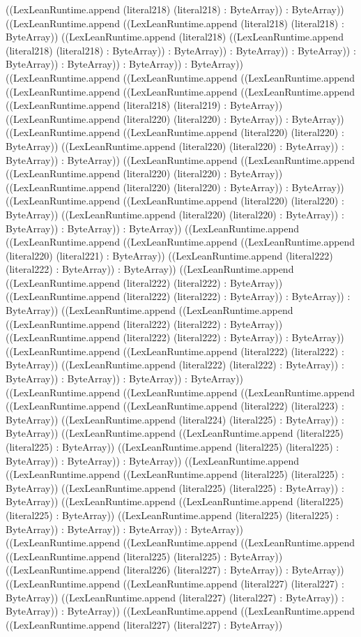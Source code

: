 \documentclass[11pt]{article}
\begin{document}
((LexLeanRuntime.append (literal218) (literal218) : ByteArray)) : ByteArray)) ((LexLeanRuntime.append ((LexLeanRuntime.append (literal218) (literal218) : ByteArray)) ((LexLeanRuntime.append (literal218) ((LexLeanRuntime.append (literal218) (literal218) : ByteArray)) : ByteArray)) : ByteArray)) : ByteArray)) : ByteArray)) : ByteArray)) : ByteArray)) : ByteArray)) ((LexLeanRuntime.append ((LexLeanRuntime.append ((LexLeanRuntime.append ((LexLeanRuntime.append ((LexLeanRuntime.append ((LexLeanRuntime.append ((LexLeanRuntime.append (literal218) (literal219) : ByteArray)) ((LexLeanRuntime.append (literal220) (literal220) : ByteArray)) : ByteArray)) ((LexLeanRuntime.append ((LexLeanRuntime.append (literal220) (literal220) : ByteArray)) ((LexLeanRuntime.append (literal220) (literal220) : ByteArray)) : ByteArray)) : ByteArray)) ((LexLeanRuntime.append ((LexLeanRuntime.append ((LexLeanRuntime.append (literal220) (literal220) : ByteArray)) ((LexLeanRuntime.append (literal220) (literal220) : ByteArray)) : ByteArray)) ((LexLeanRuntime.append ((LexLeanRuntime.append (literal220) (literal220) : ByteArray)) ((LexLeanRuntime.append (literal220) (literal220) : ByteArray)) : ByteArray)) : ByteArray)) : ByteArray)) ((LexLeanRuntime.append ((LexLeanRuntime.append ((LexLeanRuntime.append ((LexLeanRuntime.append (literal220) (literal221) : ByteArray)) ((LexLeanRuntime.append (literal222) (literal222) : ByteArray)) : ByteArray)) ((LexLeanRuntime.append ((LexLeanRuntime.append (literal222) (literal222) : ByteArray)) ((LexLeanRuntime.append (literal222) (literal222) : ByteArray)) : ByteArray)) : ByteArray)) ((LexLeanRuntime.append ((LexLeanRuntime.append ((LexLeanRuntime.append (literal222) (literal222) : ByteArray)) ((LexLeanRuntime.append (literal222) (literal222) : ByteArray)) : ByteArray)) ((LexLeanRuntime.append ((LexLeanRuntime.append (literal222) (literal222) : ByteArray)) ((LexLeanRuntime.append (literal222) (literal222) : ByteArray)) : ByteArray)) : ByteArray)) : ByteArray)) : ByteArray)) ((LexLeanRuntime.append ((LexLeanRuntime.append ((LexLeanRuntime.append ((LexLeanRuntime.append ((LexLeanRuntime.append (literal222) (literal223) : ByteArray)) ((LexLeanRuntime.append (literal224) (literal225) : ByteArray)) : ByteArray)) ((LexLeanRuntime.append ((LexLeanRuntime.append (literal225) (literal225) : ByteArray)) ((LexLeanRuntime.append (literal225) (literal225) : ByteArray)) : ByteArray)) : ByteArray)) ((LexLeanRuntime.append ((LexLeanRuntime.append ((LexLeanRuntime.append (literal225) (literal225) : ByteArray)) ((LexLeanRuntime.append (literal225) (literal225) : ByteArray)) : ByteArray)) ((LexLeanRuntime.append ((LexLeanRuntime.append (literal225) (literal225) : ByteArray)) ((LexLeanRuntime.append (literal225) (literal225) : ByteArray)) : ByteArray)) : ByteArray)) : ByteArray)) ((LexLeanRuntime.append ((LexLeanRuntime.append ((LexLeanRuntime.append ((LexLeanRuntime.append (literal225) (literal225) : ByteArray)) ((LexLeanRuntime.append (literal226) (literal227) : ByteArray)) : ByteArray)) ((LexLeanRuntime.append ((LexLeanRuntime.append (literal227) (literal227) : ByteArray)) ((LexLeanRuntime.append (literal227) (literal227) : ByteArray)) : ByteArray)) : ByteArray)) ((LexLeanRuntime.append ((LexLeanRuntime.append ((LexLeanRuntime.append (literal227) (literal227) : ByteArray)) 
\end{document}

